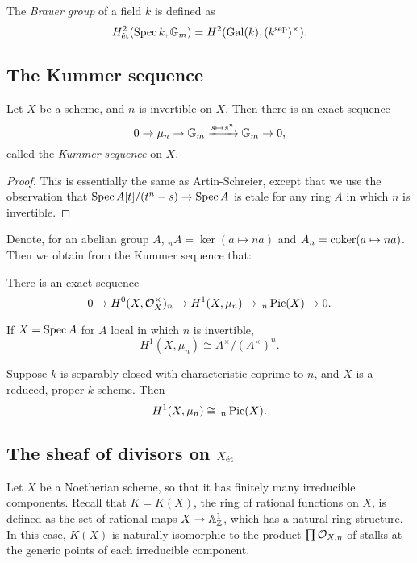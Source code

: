 \documentclass[11pt]{amsart}
\begin{document}
\begin{defn}
    The \emph{Brauer group} of a field $k$ is defined as 
    \[H^2_{\operatorname{\acute{e}t}}(\operatorname{Spec} k, \mathbb{G}_m) = H^2(\operatorname{Gal}(k), (k^{\operatorname{sep}})^{\times}).\]
\end{defn}


\subsection{The Kummer sequence}

\begin{thm}
    Let $X$ be a scheme, and $n$ is invertible on $X$. Then there is an exact sequence
    \[0\to \mu_n \to \mathbb{G}_m\xrightarrow{s\mapsto s^n} \mathbb{G}_m \to 0,\]
    called the \emph{Kummer sequence} on $X$.
\end{thm}

\begin{proof}
    This is essentially the same as Artin-Schreier, except that we use the observation that $\operatorname{Spec} A[t]/(t^n - s) \to \operatorname{Spec} A$ is etale for any ring $A$ in which $n$ is invertible.
\end{proof}


Denote, for an abelian group $A$, $_nA = \ker(a\mapsto na)$ and $A_n = \operatorname{coker}(a\mapsto na)$. Then we obtain from the Kummer sequence that:

\begin{cor}
    There is an exact sequence
    \[0\to H^0(X, \mathcal{O}_X^{\times})_n \to H^1(X, \mu_n) \to\thinspace_n\operatorname{Pic}(X)\to 0.\]
\end{cor}

\begin{cor}
    If $X = \operatorname{Spec} A$ for $A$ local in which $n$ is invertible,
    \[H^1(X,\mu_n) \cong A^{\times}/(A^{\times})^n.\]
\end{cor}

\begin{cor}
    Suppose $k$ is separably closed with characteristic coprime to $n$, and $X$ is a reduced, proper $k$-scheme. Then
    \[H^1(X, \mu_n) \cong \thinspace _n\operatorname{Pic}(X).\]
\end{cor}


\subsection{The sheaf of divisors on $X_{\operatorname{\acute{e}t}}$}

Let $X$ be a Noetherian scheme, so that it has finitely many irreducible components. Recall that $K = K(X)$, the ring of rational functions on $X$, is defined as the set of rational maps $X\to \mathbb{A}^1_{\mathbb{Z}}$, which has a natural ring structure. \href{https://stacks.math.columbia.edu/tag/01RR}{In this case}, $K(X)$ is naturally isomorphic to the product $\prod \mathcal{O}_{X,\eta}$ of stalks at the generic points of each irreducible component.
\end{document}
